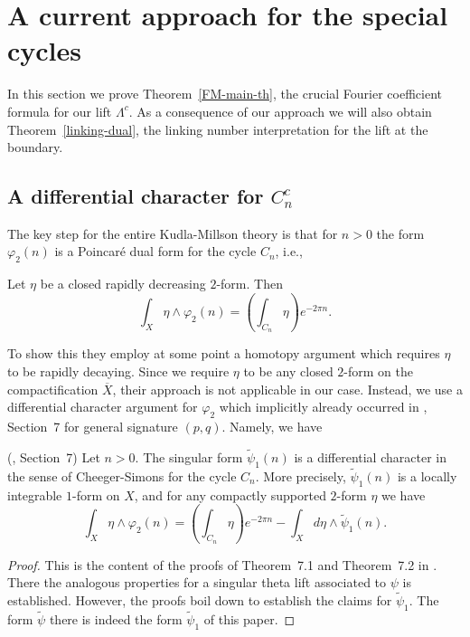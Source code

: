  



\section{A current approach for the special cycles}\label{currents}

In this section we prove Theorem~\ref{FM-main-th}, the crucial Fourier coefficient formula for our lift $\Lambda^c$.  As a consequence of our approach we will also obtain Theorem~\ref{linking-dual}, the linking number interpretation for the lift at the boundary. 

\subsection{A differential character for $C_n^c$}

The key step for the entire Kudla-Millson theory is that for $n>0$ the form $\varphi_2(n)$ is a Poincar\'e dual form for the cycle $C_n$, i.e., 

\begin{theorem}
Let $\eta$ be a closed rapidly decreasing $2$-form. Then 
\[
\int_X \eta \wedge  \varphi_2(n)= \left(\int_{C_n} \eta \right) e^{-2\pi n}.
\]
\end{theorem}

To show this they employ at some point a homotopy argument which requires $\eta$ to be rapidly decaying. Since we require $\eta$ to be any closed $2$-form on the compactification $\overline{X}$, their approach is not applicable in our case. Instead, we use a differential character argument for $\varphi_2$ which implicitly already occurred in \cite{BFDuke}, Section~7 for general signature $(p,q)$. Namely, we have

\begin{theorem} (\cite{BFDuke}, Section~7)\label{BrFu}
Let $n>0$. 
The singular form $ \tilde{\psi}_1(n)$ is a differential character in the sense of Cheeger-Simons for the cycle $C_n$. More precisely, $\tilde{\psi}_1(n)$ is a locally integrable $1$-form on $X$, and for any compactly supported $2$-form $\eta$ we have 
\[
\int_{X} \eta \wedge \varphi_2(n)  = \left(\int_{C_n}  \eta \right) e^{-2 \pi n}  - \int_{X}  d \eta\wedge \tilde{\psi}_1(n).
\]
\end{theorem}

\begin{proof}
This is the content of the proofs of Theorem~7.1 and Theorem~7.2 in \cite{BFDuke}. There the analogous properties for a singular theta lift associated to $\psi$ is established. However, the proofs boil down to establish the claims for $\tilde{\psi}_1$. The form $\tilde{\psi}$ there is indeed the form $\tilde{\psi}_1$ of this paper. 
\end{proof}

